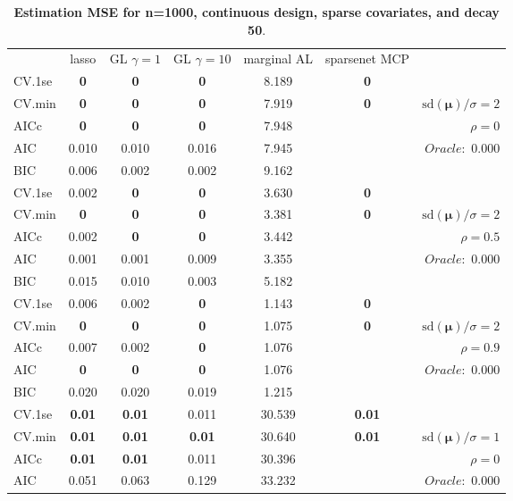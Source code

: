 \clearpage
\begin{table}\vspace{-.5cm}
\caption[l]{ { \bf Estimation MSE for n=1000, continuous design, 
sparse covariates, and  decay  50}.}
\vspace{-.5cm}
\footnotesize{}
\begin{center}
\begin{tabular}{l*{5}{c}|r}
& lasso & GL $\gamma=1$ & GL $\gamma=10$ & marginal AL & sparsenet MCP  & \\
 \cline{1-7}
CV.1se & {\bf 0} & {\bf 0} & {\bf 0} & 8.189 & {\bf 0} & \\
CV.min & {\bf 0} & {\bf 0} & {\bf 0} & 7.919 & {\bf 0} &  $\mathrm{sd}(\mathbf{\mu})/\sigma=2$ \\
AICc & {\bf 0} & {\bf 0} & {\bf 0} & 7.948 & & $\rho=0$ \\
AIC & 0.010 & 0.010 & 0.016 & 7.945 & &  \multirow{2}{*}{$Oracle: $ 0.000} \\
BIC & 0.006 & 0.002 & 0.002 & 9.162 & &  \\
 \hline 
CV.1se & 0.002 & {\bf 0} & {\bf 0} & 3.630 & {\bf 0} & \\
CV.min & {\bf 0} & {\bf 0} & {\bf 0} & 3.381 & {\bf 0} &  $\mathrm{sd}(\mathbf{\mu})/\sigma=2$ \\
AICc & 0.002 & {\bf 0} & {\bf 0} & 3.442 & & $\rho=0.5$ \\
AIC & 0.001 & 0.001 & 0.009 & 3.355 & &  \multirow{2}{*}{$Oracle: $ 0.000} \\
BIC & 0.015 & 0.010 & 0.003 & 5.182 & &  \\
 \hline 
CV.1se & 0.006 & 0.002 & {\bf 0} & 1.143 & {\bf 0} & \\
CV.min & {\bf 0} & {\bf 0} & {\bf 0} & 1.075 & {\bf 0} &  $\mathrm{sd}(\mathbf{\mu})/\sigma=2$ \\
AICc & 0.007 & 0.002 & {\bf 0} & 1.076 & & $\rho=0.9$ \\
AIC & {\bf 0} & {\bf 0} & {\bf 0} & 1.076 & &  \multirow{2}{*}{$Oracle: $ 0.000} \\
BIC & 0.020 & 0.020 & 0.019 & 1.215 & &  \\
 \hline 
CV.1se & {\bf 0.01} & {\bf 0.01} & 0.011 & 30.539 & {\bf 0.01} & \\
CV.min & {\bf 0.01} & {\bf 0.01} & {\bf 0.01} & 30.640 & {\bf 0.01} &  $\mathrm{sd}(\mathbf{\mu})/\sigma=1$ \\
AICc & {\bf 0.01} & {\bf 0.01} & 0.011 & 30.396 & & $\rho=0$ \\
AIC & 0.051 & 0.063 & 0.129 & 33.232 & &  \multirow{2}{*}{$Oracle: $ 0.000} \\

\end{tabular}
\end{center}
\end{table}
